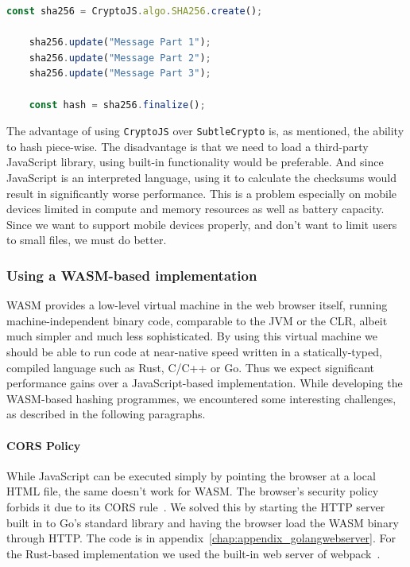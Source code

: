 \begin{lstlisting}[caption={Progressive SHA-256 hashing using CryptoJS},captionpos=b,language=JavaScript,label={lst:cryptojsprogressive}]
    const sha256 = CryptoJS.algo.SHA256.create();

    sha256.update("Message Part 1");
    sha256.update("Message Part 2");
    sha256.update("Message Part 3");

    const hash = sha256.finalize();
\end{lstlisting}

The advantage of using \texttt{CryptoJS} over \texttt{SubtleCrypto} is, as mentioned, the ability to hash piece-wise.
The disadvantage is that we need to load a third-party JavaScript library, using built-in functionality would be preferable.
And since JavaScript is an interpreted language, using it to calculate the checksums would result in significantly worse performance.
This is a problem especially on mobile devices limited in compute and memory resources as well as battery capacity.
Since we want to support mobile devices properly, and don't want to limit users to small files, we must do better.

\subsubsection{Using a WASM-based implementation}
\label{subsubsec:wasmhashing}
\gls{WASM} provides a low-level virtual machine in the web browser itself,
running machine-independent binary code, comparable to the \gls{JVM} or the \gls{CLR},
albeit much simpler and much less sophisticated.
By using this virtual machine we should be able to run code at near-native speed written in a statically-typed, compiled language such as Rust, C/C++ or Go.
Thus we expect significant performance gains over a JavaScript-based implementation.
While developing the \gls{WASM}-based hashing programmes, we encountered some interesting challenges, as described in the following paragraphs.

\paragraph{CORS Policy} While JavaScript can be executed simply by pointing the browser at a local \gls{HTML} file, the same doesn't work for \gls{WASM}.
The browser's security policy forbids it due to its \gls{CORS} rule~\cite{cors}.
We solved this by starting the \gls{HTTP} server built in to Go's standard library and having the browser load the \gls{WASM} binary through \gls{HTTP}.
The code is in appendix~\ref{chap:appendix_golangwebserver}.
For the Rust-based implementation we used the built-in web server of webpack~\cite{webpack}.

